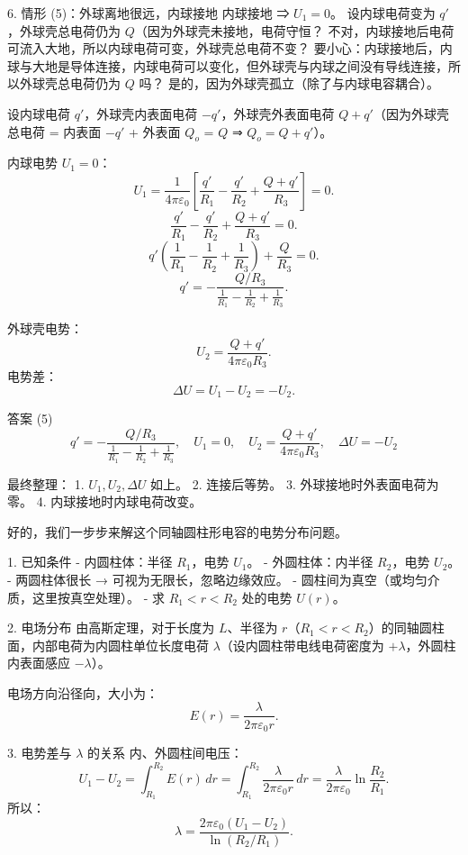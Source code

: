 \documentclass{article}
\begin{document}
 6. 情形 (5)：外球离地很远，内球接地
内球接地 ⇒ $ U_1 = 0 $。  
设内球电荷变为 $ q' $，外球壳总电荷仍为 $ Q $（因为外球壳未接地，电荷守恒？ 不对，内球接地后电荷可流入大地，所以内球电荷可变，外球壳总电荷不变？ 要小心：内球接地后，内球与大地是导体连接，内球电荷可以变化，但外球壳与内球之间没有导线连接，所以外球壳总电荷仍为 $ Q $ 吗？ 是的，因为外球壳孤立（除了与内球电容耦合）。  

设内球电荷 $ q' $，外球壳内表面电荷 $ -q' $，外球壳外表面电荷 $ Q + q' $（因为外球壳总电荷 = 内表面 $ -q' $ + 外表面 $ Q_o $ = $ Q $ ⇒ $ Q_o = Q + q' $）。

内球电势 $ U_1 = 0 $：
$$
U_1 = \frac{1}{4\pi\varepsilon_0} \left[ \frac{q'}{R_1} - \frac{q'}{R_2} + \frac{Q + q'}{R_3} \right] = 0.
$$
$$
\frac{q'}{R_1} - \frac{q'}{R_2} + \frac{Q + q'}{R_3} = 0.
$$
$$
q' \left( \frac{1}{R_1} - \frac{1}{R_2} + \frac{1}{R_3} \right) + \frac{Q}{R_3} = 0.
$$
$$
q' = -\frac{Q/R_3}{\frac{1}{R_1} - \frac{1}{R_2} + \frac{1}{R_3}}.
$$

外球壳电势：
$$
U_2 = \frac{Q + q'}{4\pi\varepsilon_0 R_3}.
$$
电势差：
$$
\Delta U = U_1 - U_2 = -U_2.
$$



 答案 (5)
$$
\boxed{q' = -\frac{Q/R_3}{\frac{1}{R_1} - \frac{1}{R_2} + \frac{1}{R_3}}, \quad U_1 = 0, \quad U_2 = \frac{Q + q'}{4\pi\varepsilon_0 R_3}, \quad \Delta U = -U_2}
$$



最终整理：
1. $ U_1, U_2, \Delta U $ 如上。
2. 连接后等势。
3. 外球接地时外表面电荷为零。
4. 内球接地时内球电荷改变。





好的，我们一步步来解这个同轴圆柱形电容的电势分布问题。  



 1. 已知条件
- 内圆柱体：半径 $ R_1 $，电势 $ U_1 $。
- 外圆柱体：内半径 $ R_2 $，电势 $ U_2 $。
- 两圆柱体很长 → 可视为无限长，忽略边缘效应。
- 圆柱间为真空（或均匀介质，这里按真空处理）。
- 求 $ R_1 < r < R_2 $ 处的电势 $ U(r) $。



 2. 电场分布
由高斯定理，对于长度为 $ L $、半径为 $ r $（$ R_1 < r < R_2 $）的同轴圆柱面，内部电荷为内圆柱单位长度电荷 $ \lambda $（设内圆柱带电线电荷密度为 $ +\lambda $，外圆柱内表面感应 $ -\lambda $）。

电场方向沿径向，大小为：
$$
E(r) = \frac{\lambda}{2\pi\varepsilon_0 r}.
$$



 3. 电势差与 $\lambda$ 的关系
内、外圆柱间电压：
$$
U_1 - U_2 = \int_{R_1}^{R_2} E(r) \, dr
= \int_{R_1}^{R_2} \frac{\lambda}{2\pi\varepsilon_0 r} \, dr
= \frac{\lambda}{2\pi\varepsilon_0} \ln\frac{R_2}{R_1}.
$$
所以：
$$
\lambda = \frac{2\pi\varepsilon_0 (U_1 - U_2)}{\ln(R_2/R_1)}.
$$
\end{document}

